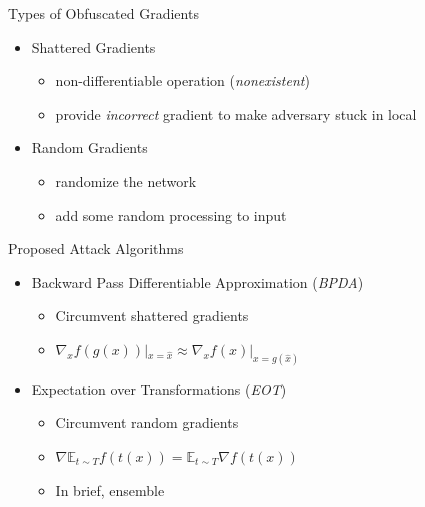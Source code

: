 \documentclass{beamer}
\begin{document}
\begin{frame}{Types of Obfuscated Gradients}
  \begin{itemize}
    \item Shattered Gradients 
      \begin{itemize}
        \item non-differentiable operation (\textit{nonexistent})
        \item provide \textit{incorrect} gradient to make adversary stuck in local
      \end{itemize}
    \item Random Gradients
        \begin{itemize}
          \item randomize the network
          \item add some random processing to input
        \end{itemize}
  \end{itemize}
\end{frame}

\begin{frame}{Proposed Attack Algorithms}
  \begin{itemize}
    \item Backward Pass Differentiable Approximation (\textit{BPDA})
      \begin{itemize}
        \item Circumvent shattered gradients
        \item $\nabla_xf(g(x))|_{x = \hat{x}} \approx \nabla_xf(x)|_{x = g(\hat{x})}$
      \end{itemize}

    \item Expectation over Transformations (\textit{EOT})
      \begin{itemize}
        \item Circumvent random gradients
        \item $\nabla\mathbb{E}_{t \sim T}f(t(x)) = \mathbb{E}_{t \sim T} \nabla f(t(x))$
        \item In brief, ensemble
      \end{itemize}
  \end{itemize}
\end{frame}
\end{document}
